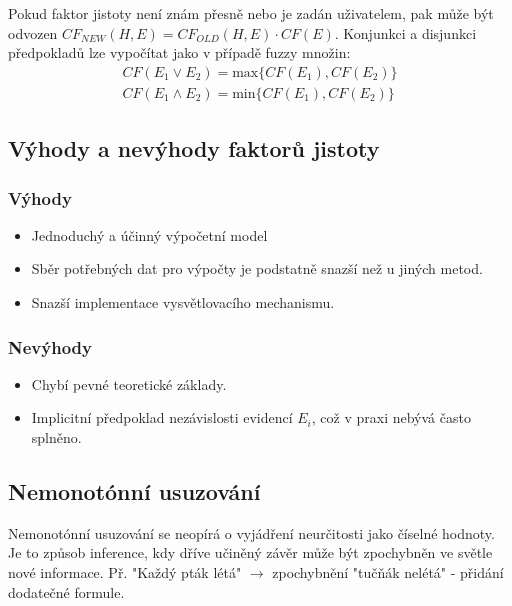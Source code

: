 \documentclass[12pt]{article}
\begin{document}
Pokud faktor jistoty není znám přesně nebo je zadán uživatelem, pak může být odvozen $CF_{NEW}(H, E)=CF_{OLD}(H, E)\cdot CF(E)$. Konjunkci a disjunkci předpokladů lze vypočítat jako v případě fuzzy množin:
\begin{equation}
\begin{aligned}
CF(E_1 \lor E_2) = \text{max}\{CF(E_1), CF(E_2)\}\\
CF(E_1 \wedge E_2) = \text{min}\{CF(E_1), CF(E_2)\}
\end{aligned}
\end{equation}



\subsection{Výhody a nevýhody faktorů jistoty}
\subsubsection*{Výhody}
\begin{itemize}
\item Jednoduchý a účinný výpočetní model
\item Sběr potřebných dat pro výpočty je podstatně snazší než u jiných metod.
\item Snazší implementace vysvětlovacího mechanismu.
\end{itemize}

\subsubsection*{Nevýhody}
\begin{itemize}
\item Chybí pevné teoretické základy.
\item Implicitní předpoklad nezávislosti evidencí $E_i$, což v praxi nebývá často splněno.
\end{itemize}

\subsection{Nemonotónní usuzování}
Nemonotónní usuzování se neopírá o vyjádření neurčitosti jako číselné hodnoty. Je to způsob inference, kdy dříve učiněný závěr může být 
zpochybněn ve světle nové informace. Př. "Každý pták létá" $\rightarrow$ zpochybnění "tučňák nelétá" - přidání dodatečné formule.
\end{document}
